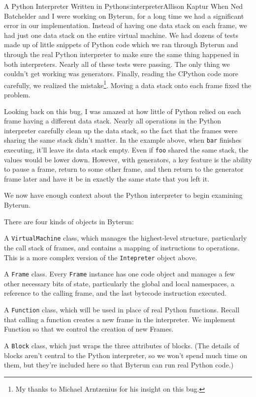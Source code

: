 \begin{aosachapter}{A Python Interpreter Written in Python}{s:interpreter}{Allison Kaptur}
When Ned Batchelder and I were working on Byterun, for a long time we
had a significant error in our implementation. Instead of having one
data stack on each frame, we had just one data stack on the entire
virtual machine. We had dozens of tests made up of little snippets of
Python code which we ran through Byterun and through the real Python
interpreter to make sure the same thing happened in both interpreters.
Nearly all of these tests were passing. The only thing we couldn't get
working was generators. Finally, reading the CPython code more
carefully, we realized the mistake\footnote{My thanks to Michael
  Arntzenius for his insight on this bug.}. Moving a data stack onto
each frame fixed the problem.

Looking back on this bug, I was amazed at how little of Python relied on
each frame having a different data stack. Nearly all operations in the
Python interpreter carefully clean up the data stack, so the fact that
the frames were sharing the same stack didn't matter. In the example
above, when \texttt{bar} finishes executing, it'll leave its data stack
empty. Even if \texttt{foo} shared the same stack, the values would be
lower down. However, with generators, a key feature is the ability to
pause a frame, return to some other frame, and then return to the
generator frame later and have it be in exactly the same state that you
left it.

\label{byterun}

We now have enough context about the Python interpreter to begin
examining Byterun.

There are four kinds of objects in Byterun:

\begin{aosaitemize}

\item
  A \texttt{VirtualMachine} class, which manages the highest-level
  structure, particularly the call stack of frames, and contains a
  mapping of instructions to operations. This is a more complex version
  of the \texttt{Intepreter} object above.
\item
  A \texttt{Frame} class. Every \texttt{Frame} instance has one code
  object and manages a few other necessary bits of state, particularly
  the global and local namespaces, a reference to the calling frame, and
  the last bytecode instruction executed.
\item
  A \texttt{Function} class, which will be used in place of real Python
  functions. Recall that calling a function creates a new frame in the
  interpreter. We implement Function so that we control the creation of
  new Frames.
\item
  A \texttt{Block} class, which just wraps the three attributes of
  blocks. (The details of blocks aren't central to the Python
  interpreter, so we won't spend much time on them, but they're included
  here so that Byterun can run real Python code.)
\end{aosaitemize}


\end{aosachapter}
